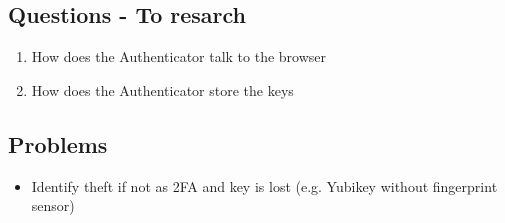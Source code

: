

\subsection{Questions - To resarch}

\begin{enumerate}
	\item How does the Authenticator talk to the browser
	\item How does the Authenticator store the keys
\end{enumerate}

\subsection{Problems}

\begin{itemize}
	\item Identify theft if not as 2FA and key is lost (e.g. Yubikey without fingerprint sensor)
\end{itemize}